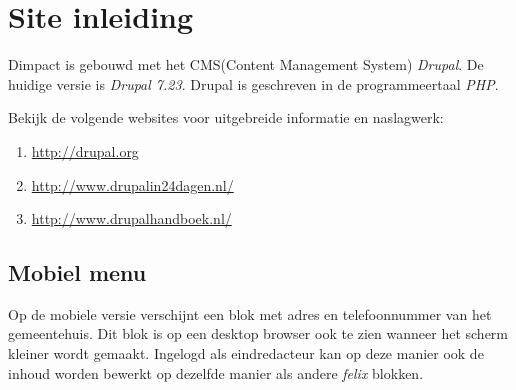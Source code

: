 
\section{Site inleiding}\label{siteinleiding}
Dimpact is gebouwd met het CMS(Content Management System) \emph{Drupal}. De huidige versie is \emph{Drupal 7.23}.
Drupal is geschreven in de programmeertaal \emph{PHP}.

Bekijk de volgende websites voor uitgebreide informatie en naslagwerk:

\begin{enumerate}
\item \url{http://drupal.org}
\item \url{http://www.drupalin24dagen.nl/}
\item \url{http://www.drupalhandboek.nl/}
\end{enumerate}




\subsection{Mobiel menu}

Op de mobiele versie verschijnt een blok met adres en telefoonnummer van het gemeentehuis. Dit blok is op een desktop browser ook te zien wanneer het scherm kleiner wordt gemaakt. Ingelogd als eindredacteur kan op deze manier ook de inhoud worden bewerkt op dezelfde manier als andere \emph{felix} blokken.
